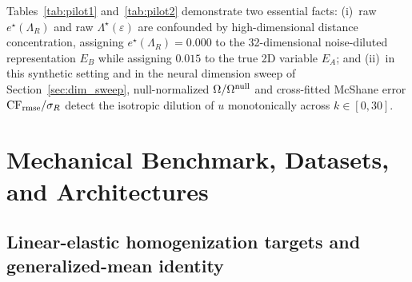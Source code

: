 \documentclass[preprint,11pt,a4paper]{elsarticle}
\begin{document}
Tables~\ref{tab:pilot1} and~\ref{tab:pilot2} demonstrate two essential facts:
(i)~raw $e^\star(\Lambda_R)$ and raw $\Lambda^\star(\varepsilon)$ are confounded by high-dimensional distance concentration, assigning $e^\star(\Lambda_R)=0.000$ to the 32-dimensional noise-diluted representation $E_B$ while assigning $0.015$ to the true 2D variable $E_A$; and
(ii)~in this synthetic setting and in the neural dimension sweep of Section~\ref{sec:dim_sweep}, null-normalized $\Omega/\Omega^{\rm null}$ and cross-fitted McShane error ${\rm CF}_{\rm rmse}/\sigma_R$ detect the isotropic dilution of $u$ monotonically across $k\in[0,30]$.

\section{Mechanical Benchmark, Datasets, and Architectures}
\label{sec:benchmark}

\subsection{Linear-elastic homogenization targets and generalized-mean identity}
\label{sec:targets}
\end{document}
